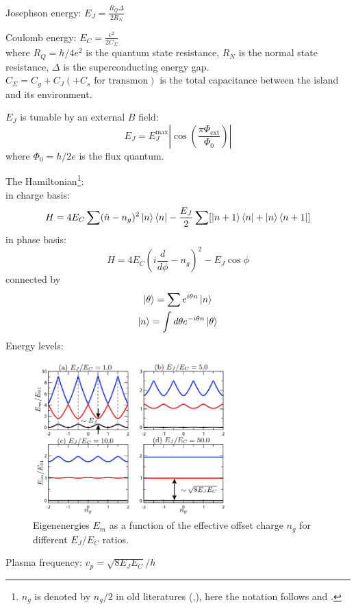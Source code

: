 \documentclass[8pt,a4paper,twocolumn]{article} %
\numberwithin{equation}{section} %
\begin{document}
			Josephson energy: $ E_J=\frac{R_Q \Delta}{2R_N} $

			Coulomb energy: $E_C=\frac{e^2}{2 C_{\Sigma}}  $\\
			where $ R_Q = h/4e^2 $ is the quantum state resistance, $R_N$ is the normal state resistance, $\Delta$ is the superconducting energy gap. $ C_{\Sigma}=C_g+C_J(+C_s\text{ for transmon}) $ is the total capacitance between the island and its environment.

			$ E_J $ is tunable by an external $B$ field:
			\begin{equation}
				E_J=E_J^{\text{max}}\left| \cos \left( \frac{\pi \Phi_{\text{ext}}}{\Phi_0} \right) \right|
			\end{equation}
			where $\Phi_0=h/2e $ is the flux quantum.

			The Hamiltonian\footnote{$n_g$ is denoted by $n_g/2$ in old literatures (\cite{Schuster2007},\cite{SchusterEtal2005}), here the notation follows \cite{Koch2007} and \cite{Krantz2010}. }:\\
			in charge basis:
			\begin{equation}
				H=4E_C \sum (\hat{n}-n_g)^2 \ket n \bra n -\frac{E_J}{2}\sum[ \ket{n+1}\bra n+ \ket n \bra{n+1} ]
			\end{equation}
			in phase basis:
			\begin{equation}
				H=4E_C(i\frac{d}{d \phi} -n_g)^2-E_J \cos \phi
			\end{equation}
			connected by
			\begin{gather}
				\ket \theta = \sum e^{i \theta n}\ket n\\
				\ket n = \int d \theta e^{-i \theta n}\ket \theta
			\end{gather}
			Energy levels:
			\begin{figure}[!h]
				\centering
				\includegraphics[width=3in]{transmonEnLevel.png}
				\caption{Eigenenergies $E_m$ as a function of the effective offset charge $n_g$ for different $E_J/E_C$ ratios.\cite{Koch2007}}
				\label{pic:transmonEnLevel}
			\end{figure}

			Plasma frequency: $ v_p=\sqrt{8E_JE_C}/h $




	
\end{document}
